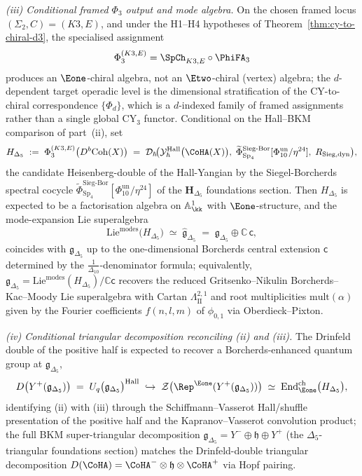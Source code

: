 \begin{theorem}
\emph{(iii) Conditional framed $\Phi_3$ output and mode algebra.} On the
chosen framed locus $(\Sigma_2,C)=(K3,E)$, and under the H1--H4
hypotheses of Theorem~\ref{thm:cy-to-chiral-d3}, the specialised
assignment
\[
 \Phi_3^{(K3,E)}=\SpCh_{K3,E}\circ\PhiFA_3
\]
produces an
$\Eone$-chiral algebra, not an $\Etwo$-chiral (vertex) algebra; the
$d$-dependent target operadic level is the dimensional stratification
of the CY-to-chiral correspondence $\{\Phi_d\}$, which is a
$d$-indexed family of framed assignments rather than a single global
CY$_3$ functor. Conditional on the Hall--BKM comparison of
part~\textup{(ii)}, set
\[
 H_{\Delta_5}
 \;:=\;
 \Phi_3^{(K3,E)}\bigl(D^b\mathrm{Coh}(X)\bigr)
 \;=\;
 \mathcal D_\hbar\!\bigl(\mathcal Y^{\mathrm{Hall}}_\hbar\bigl(\CoHA(X)\bigr),\;
 \widetilde\Phi^{\mathrm{Sieg\text{-}Bor}}_{\mathrm{Sp}_4}[\Phi_{10}^{\mathrm{un}}/\eta^{24}],\;
 R_{\mathrm{Sieg,dyn}}\bigr),
\]
the candidate Heisenberg-double of the Hall-Yangian by the Siegel-Borcherds
spectral cocycle $\widetilde\Phi^{\mathrm{Sieg\text{-}Bor}}_{\mathrm{Sp}_4}[\Phi_{10}^{\mathrm{un}}/\eta^{24}]$
of the $\mathbf H_{\Delta_5}$ foundations section. Then $H_{\Delta_5}$ is expected to be a factorisation algebra
on $\mathbb A^1_\kk$ with $\Eone$-structure, and the mode-expansion
Lie superalgebra
\[
 \mathrm{Lie}^{\mathrm{modes}}\bigl(H_{\Delta_5}\bigr)
 \;\simeq\;
 \widehat{\mathfrak g}_{\Delta_5}
 \;=\;
 \mathfrak g_{\Delta_5}\oplus\mathbb C\,\mathsf c,
\]
coincides with $\mathfrak g_{\Delta_5}$ up to the one-dimensional
Borcherds central extension $\mathsf c$ determined by the
$\frac{1}{\Delta_{10}}$-denominator formula; equivalently,
$\mathfrak g_{\Delta_5}
=\mathrm{Lie}^{\mathrm{modes}}(H_{\Delta_5})/\mathbb C\mathsf c$
recovers the reduced Gritsenko--Nikulin Borcherds--Kac--Moody Lie
superalgebra with Cartan $\Lambda_{\mathrm{II}}^{2,1}$ and root
multiplicities $\mathrm{mult}(\alpha)$ given by the Fourier
coefficients $f(n,l,m)$ of $\phi_{0,1}$ via Oberdieck--Pixton.

\medskip

\emph{(iv) Conditional triangular decomposition reconciling (ii) and (iii).} The
Drinfeld double of the positive half is expected to recover a Borcherds-enhanced
quantum group at $\mathfrak g_{\Delta_5}$,
\[
 D\bigl(Y^+(\mathfrak g_{\Delta_5})\bigr)
 \;=\;
 U_q\bigl(\mathfrak g_{\Delta_5}\bigr)^{\mathrm{Hall}}
 \;\hookrightarrow\;
 \mathcal Z\bigl(\Rep^{\Eone}(Y^+(\mathfrak g_{\Delta_5}))\bigr)
 \;\simeq\;
 \mathrm{End}^{\mathrm{ch}}_{\Eone}\bigl(H_{\Delta_5}\bigr),
\]
identifying (ii) with (iii) through the Schiffmann--Vasserot
Hall/shuffle presentation of the positive half and the Kapranov--Vasserot
convolution product; the full BKM super-triangular decomposition
$\mathfrak g_{\Delta_5}=Y^-\oplus\mathfrak h\oplus Y^+$
(the $\Delta_5$-triangular foundations section)
matches the Drinfeld-double triangular decomposition
$D(\CoHA)=\CoHA^-\otimes\mathfrak h\otimes\CoHA^+$ via Hopf pairing.
\end{theorem}

